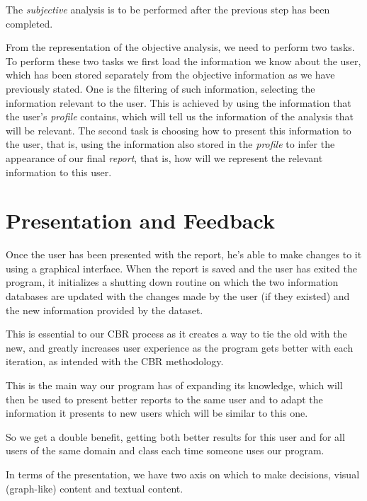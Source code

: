 The \textit{subjective} analysis is to be performed after the previous step has been completed.

From the representation of the objective analysis, we need to perform two tasks.
To perform these two tasks we first load the information we know about the user, which has been stored separately from the objective information as we have previously stated.
One is the filtering of such information, selecting the information relevant to the user. This is achieved by using the information that the user's \textit{profile} contains, which will tell us the information of the analysis that will be relevant.
The second task is choosing how to present this information to the user, that is, using the information also stored in the \textit{profile} to infer the appearance of our final \textit{report}, that is, how will we represent the relevant information to this user.

\section{Presentation and Feedback}
\label{cap2:sec:feedback}

Once the user has been presented with the report, he's able to make changes to it using a graphical interface. When the report is saved and the user has exited the program, it initializes a shutting down routine on which the two information databases are updated with the changes made by the user (if they existed) and the new information provided by the dataset.

This is essential to our CBR process as it creates a way to tie the old with the new, and greatly increases user experience as the program gets better with each iteration, as intended with the CBR methodology.

This is the main way our program has of expanding its knowledge, which will then be used to present better reports to the same user and to adapt the information it presents to new users which will be similar to this one.

So we get a double benefit, getting both better results for this user and for all users of the same domain and class each time someone uses our program.

In terms of the presentation, we have two axis on which to make decisions, visual (graph-like) content and textual content.

